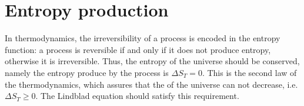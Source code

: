 \section{Entropy production}\label{C_entropy_production}

In thermodynamics, the irreversibility of a process is encoded in the entropy function: a process is reversible if and only if it does not produce entropy, otherwise it is irreversible. Thus, the entropy of the universe should be conserved, namely the entropy produce by the process is $\Delta S_T = 0$. This is the second law of the thermodynamics, which assures that the of the universe can not decrease, i.e. $\Delta S_T \geq 0$.
The Lindblad equation should satisfy this requirement.

